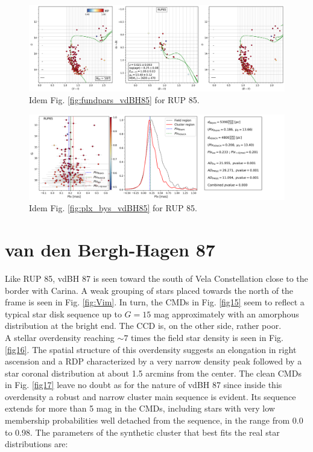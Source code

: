 \documentclass[draft]{aa}
\begin{document}
\begin{figure}[ht]
    \centering
    \includegraphics[width=\hsize]{../figs/cmds_rup85.png}
    \caption{Idem Fig. \ref{fig:fundpars_vdBH85} for RUP 85.}
    \label{fig9}
\end{figure}

\begin{figure}[ht]
    \centering
    \includegraphics[width=\hsize]{../figs/plx_RUP85.png}
    \caption{Idem Fig. \ref{fig:plx_bys_vdBH85} for RUP 85.}
    \label{fig10}
\end{figure}





\section{van den Bergh-Hagen 87}

Like RUP 85, vdBH 87 is seen toward the south of Vela Constellation close to
the border with Carina. A weak grouping of stars placed towards the north of
the frame is seen in Fig. \ref{fig:Vim}. In turn, the CMDs in Fig. \ref{fig15}
seem to reflect a typical star disk sequence up to $G=15$ mag approximately
with an amorphous distribution at the bright end. The CCD is, on the other
side, rather poor.\\

A stellar overdensity reaching $\sim7$ times the field star density is
seen in Fig. \ref{fig16}. The spatial structure of this overdensity suggests an
elongation in right ascension and a RDP characterized by a very narrow density
peak followed by a star coronal distribution at about 1.5 arcmins from the
center.
The clean CMDs in Fig. \ref{fig17} leave no doubt as for the nature of vdBH 87
since inside this overdensity a robust and narrow cluster main
sequence is evident. Its sequence extends for more than 5 mag in the
CMDs, including stars with very low membership probabilities well detached
from the sequence, in the range from 0.0 to 0.98. The parameters of the
synthetic cluster that best fits the real star distributions are:
\end{document}
